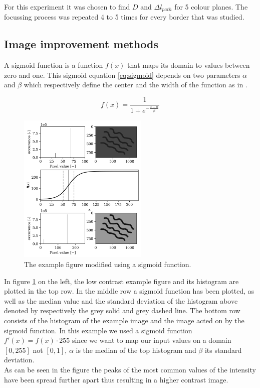 For this experiment it was chosen to find $D$ and $\Delta l_{path}$ for 5 colour planes. The focussing process was repeated 4 to 5 times for every border that was studied.

\subsection{Image improvement methods}
\label{section:imageimprovement}
A sigmoid function is a function $f(x)$ that maps its domain to values between zero and one. This sigmoid equation \ref{eq:sigmoid} depends on two parameters $\alpha$ and $\beta$ which respectively define the center and the width of the function as in \cite{article_sigmoid}.

\begin{equation}
    f(x) = \frac{1}{1+e^{-\frac{x-\alpha}{\beta}}}
    \label{eq:sigmoid}
\end{equation}

\begin{figure}
    \centering
    \includegraphics[width=0.55\textwidth,keepaspectratio]{afbeeldingen/sigmoid_explained.png}
    \caption{The example figure modified using a sigmoid function.}
    \label{fig:sigmoid}
\end{figure}

In figure \ref{fig:sigmoid} on the left, the low contrast example figure and its histogram are plotted in the top row. In the middle row a sigmoid function has been plotted, as well as the median value and the standard deviation of the histogram above denoted by respectively the grey solid and grey dashed line. The bottom row consists of the histogram of the example image and the image acted on by the sigmoid function. In this example we used a sigmoid function $f'(x)=f(x) \cdot 255$ since we want to map our input values on a domain $[0,255]$ not $[0,1]$, $\alpha$ is the median of the top histogram and $\beta$ its standard deviation.\\
As can be seen in the figure the peaks of the most common values of the intensity have been spread further apart thus resulting in a higher contrast image.\\


